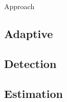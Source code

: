 
\begin{section}{Approach}
\label{sec:approach}


\subsection{Adaptive}

\subsection{Detection}



\subsection{Estimation}







\end{section}
